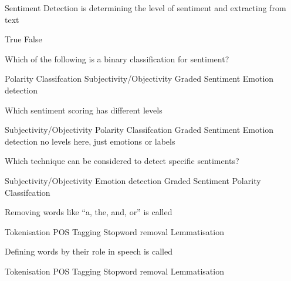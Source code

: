 \documentclass[theme=sleek, randomorder, hidesidemenu]{webquiz}
\begin{document}
\begin{question}
  Sentiment Detection is determining the level of sentiment and extracting from text
  \begin{choice}
    \incorrect True
    \correct False
  \end{choice}
\end{question}

\begin{question}
  Which of the following is a binary classification for sentiment?
  \begin{choice}
    \incorrect Polarity Classifcation
    \correct Subjectivity/Objectivity
    \incorrect Graded Sentiment
    \incorrect Emotion detection
  \end{choice}
\end{question}

\begin{question}
  Which sentiment scoring has different levels
  \begin{choice}
    \incorrect Subjectivity/Objectivity
    \incorrect Polarity Classifcation
    \correct Graded Sentiment
    \incorrect Emotion detection \feedback no levels here, just emotions or labels
  \end{choice}
\end{question}

\begin{question}
  Which technique can be considered to detect specific sentiments?
  \begin{choice}
    \incorrect Subjectivity/Objectivity
    \correct Emotion detection
    \incorrect Graded Sentiment
    \incorrect Polarity Classifcation
  \end{choice}

\end{question}

\begin{question}
  Removing words like ``a, the, and, or'' is called
  \begin{choice}
    \incorrect Tokenisation
    \incorrect POS Tagging
    \correct Stopword removal
    \incorrect Lemmatisation
  \end{choice}
\end{question}

\begin{question}
  Defining words by their role in speech is called
  \begin{choice}
    \incorrect Tokenisation
    \correct POS Tagging
    \incorrect Stopword removal
    \incorrect Lemmatisation
  \end{choice}
\end{question}
\end{document}
